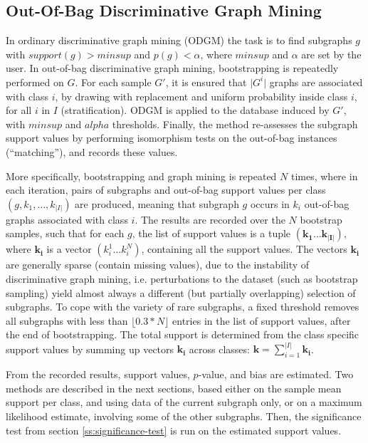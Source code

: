 \documentclass{sig-alternate}
\begin{document}
\subsection{Out-Of-Bag Discriminative Graph Mining}
\label{ss:oob-dgm}
In ordinary discriminative graph mining (ODGM) the task is to find subgraphs
$g$ with $support(g)>minsup$ and $p(g)<\alpha$, where $minsup$ and $\alpha$ are
set by the user.
In out-of-bag discriminative graph mining, bootstrapping is repeatedly performed on $G$.
For each sample $G'$, it is ensured that $\vert G^i\vert$ graphs are associated with
class $i$, by drawing with replacement and uniform probability inside 
class $i$, for all $i$ in $I$ (stratification).  
ODGM is applied to the database induced by $G'$, with $minsup$ and $alpha$ thresholds. 
Finally, the method re-assesses the subgraph support values by performing isomorphism
tests on the out-of-bag instances (``matching''), and records these values.

More specifically, bootstrapping and graph mining is repeated $N$ times, where in each
iteration, pairs of subgraphs and out-of-bag support values per class
$(g,k_1,\ldots,k_{\vert I\vert})$ are produced, meaning that subgraph $g$
occurs in $k_i$ out-of-bag graphs associated with class $i$. The results are
recorded over the $N$ bootstrap samples, such that for each $g$, the list of
support values is a tuple $(\mathbf{k_1}\ldots\mathbf{k_{\vert I\vert}})$,
where $\mathbf{k_i}$ is a vector $(k_i^1\ldots k_i^N)$, containing all the
support values.  
The vectors $\mathbf{k_i}$
are generally sparse (contain missing values), due to the instability of discriminative graph mining,
i.e. perturbations to the dataset (such as bootstrap sampling) yield almost
always a different (but partially overlapping) selection of subgraphs. To cope with the
variety of rare subgraphs, a fixed threshold removes all subgraphs with less
than $\lfloor0.3*N\rfloor$ entries in the list of support values, after the end
of bootstrapping.
The total support is determined from the class specific support values by
summing up vectors $\mathbf{k_i}$ across classes:
$\mathbf{k}=\sum_{i=1}^{\vert I\vert} \mathbf{k_i}$. 

From the recorded results, support values, $p$-value, 
and bias are estimated. Two methods are described in the next sections, based either
on the sample mean support per class, and using data of the current subgraph
only, or on a maximum likelihood estimate, involving some of the other
subgraphs. Then, the significance test from section \ref{ss:significance-test}
is run on the estimated support values. 
\end{document}
